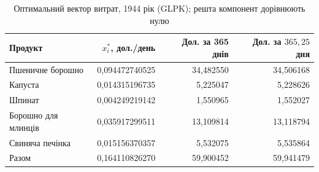 \begin{table}[htbp]
\centering\small
\caption{Оптимальний вектор витрат, 1944 рік (GLPK); решта компонент дорівнюють нулю}
\label{tab:glpk-solution-1944}
\begin{tabular}{lrrr}
\toprule
Продукт & $x_i^*$, дол./день & Дол. за 365 днів & Дол. за $365{,}25$ дня \\
\midrule
Пшеничне борошно & 0{,}094472740525 & 34{,}482550 & 34{,}506168 \\
Капуста & 0{,}014315196735 & 5{,}225047 & 5{,}228626 \\
Шпинат & 0{,}004249219142 & 1{,}550965 & 1{,}552027 \\
Борошно для млинців & 0{,}035917299511 & 13{,}109814 & 13{,}118794 \\
Свиняча печінка & 0{,}015156370357 & 5{,}532075 & 5{,}535864 \\
\midrule
Разом & 0{,}164110826270 & 59{,}900452 & 59{,}941479 \\
\bottomrule
\end{tabular}
\end{table}
